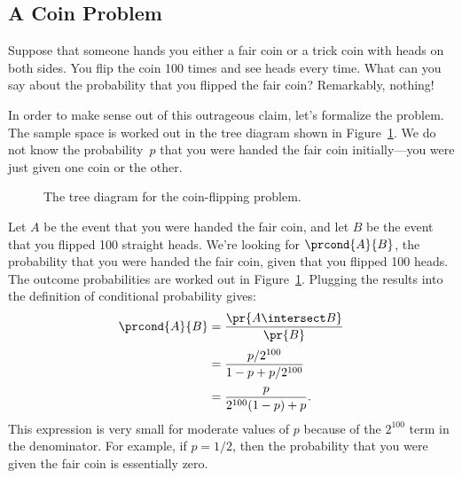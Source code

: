 

\begin{problems}
\examproblems
{}

\practiceproblems
{}

\classproblems
{}

\homeworkproblems
{}
\end{problems}

\iffalse

\subsection{A Coin Problem}

Suppose that someone hands you either a fair coin or a trick coin with
heads on both sides.  You flip the coin 100 times and see heads every
time.  What can you say about the probability that you flipped the
fair coin?  Remarkably, nothing!

In order to make sense out of this outrageous claim, let's formalize
the problem.  The sample space is worked out in the tree diagram shown
in Figure~\ref{fig:15C2}.  We do not know the probability~$p$ that you
were handed the fair coin initially---you were just given one coin or
the other.
%
\begin{figure}[h]


\caption{The tree diagram for the coin-flipping problem.}

\label{fig:15C2}

\end{figure}
%
Let $A$ be the event that you were handed the fair coin, and let $B$
be the event that you flipped 100 straight heads.  We're looking
for $\prcond{A}{B}$, the probability that you were handed the fair
coin, given that you flipped 100 heads.  The outcome probabilities are
worked out in Figure~\ref{fig:15C2}.  Plugging the results into the
definition of conditional probability gives:
%
\begin{align*}
\prcond{A}{B}	& = \frac{\pr{A \intersect B}}{\pr{B}} \\[2pt]
		& = \frac{p / 2^{100}}{1 - p + p / 2^{100}} \\[2pt]
		& = \frac{p}{2^{100} (1 - p) + p}.
\end{align*}
%
This expression is very small for moderate values of $p$ because of
the $2^{100}$ term in the denominator.  For example, if $p = 1/2$,
then the probability that you were given the fair coin is essentially
zero.

